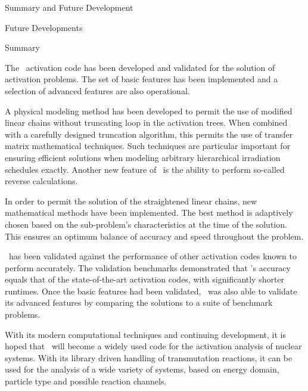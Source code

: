 \begin{chapter}{Summary and Future Development}
\begin{section}{Future Developments}
  \end{section}
  
  \begin{section}{Summary}
    
    The \ALARA\  activation code has been developed and validated for
    the solution of activation problems.  The set of basic features
    has been implemented and a selection of advanced features are also
    operational.  
    
    A physical modeling method has been developed to permit the use of
    modified linear chains without truncating loop in the activation
    trees.  When combined with a carefully designed truncation
    algorithm, this permits the use of transfer matrix mathematical
    techniques.  Such techniques are particular important for ensuring
    efficient solutions when modeling arbitrary hierarchical
    irradiation schedules exactly.  Another new feature of \ALARA\  is
    the ability to perform so-called reverse calculations.
    
    In order to permit the solution of the straightened linear chains,
    new mathematical methods have been implemented.  The best method
    is adaptively chosen based on the sub-problem's characteristics at
    the time of the solution.  This ensures an optimum balance of
    accuracy and speed throughout the problem.
    
    \ALARA\  has been validated against the performance of other
    activation codes known to perform accurately.  The validation
    benchmarks demonstrated that \ALARA's accuracy equals that of the
    state-of-the-art activation codes, with significantly shorter
    runtimes.  Once the basic features had been validated, \ALARA\  was
    also able to validate its advanced features by comparing the
    solutions to a suite of benchmark problems.
    
    With its modern computational techniques and continuing
    development, it is hoped that \ALARA\  will become a widely used
    code for the activation analysis of nuclear systems.  With its
    library driven handling of transmutation reactions, it can be used
    for the analysis of a wide variety of systems, based on energy
    domain, particle type and possible reaction channels.

  \end{section}

\end{chapter}